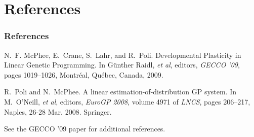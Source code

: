 \documentclass{beamer}
\newcommand{\linespace}{\vskip 0.25cm}
\begin{document}
\section*{References}

\begin{frame} 
	\frametitle{References} 
	
	\begin{thebibliography}{lskdjf}
	
N.~F. McPhee, E.~Crane, S.~Lahr, and R.~Poli.
\newblock Developmental Plasticity in Linear Genetic Programming.
\newblock In G\"unther Raidl, \emph{et al}, editors, {\em GECCO '09}, pages 1019--1026, Montr\'eal, Qu\'ebec, Canada, 2009.
	
	R.~Poli and N.~McPhee.
\newblock A linear estimation-of-distribution {GP} system.
\newblock In M.~O'Neill, \emph{et al}, editors, {\em EuroGP 2008}, volume
  4971 of {\em LNCS}, pages 206--217, Naples,
  26-28 Mar. 2008. Springer.
  
  	\end{thebibliography}
	
	\linespace
	\begin{center}
	See the GECCO '09 paper for additional references.
	\end{center}
\end{frame} 
\end{document}
